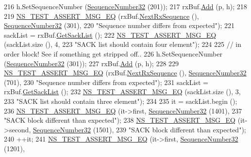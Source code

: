 \begin{DoxyCode}
216   h.SetSequenceNumber (\hyperlink{classns3_1_1SequenceNumber}{SequenceNumber32} (201));
217   rxBuf.\hyperlink{classns3_1_1TcpRxBuffer_a35a036383b8976cb79738c28aa01d5d0}{Add} (p, h);
218 
219   \hyperlink{group__testing_ga2a9d78cffb3db8e867c35fff0b698cf5}{NS\_TEST\_ASSERT\_MSG\_EQ} (rxBuf.\hyperlink{classns3_1_1TcpRxBuffer_ae994bf90329d10f17b59d32907b04ca9}{NextRxSequence} (), 
      \hyperlink{group__network_gacb2070e4e98d2d5135c9bede58f07a03}{SequenceNumber32} (301),
220                          \textcolor{stringliteral}{"Sequence number differs from expected"});
221   sackList = rxBuf.\hyperlink{classns3_1_1TcpRxBuffer_afc5d672da4595330754de1bb3933a9c7}{GetSackList} ();
222   \hyperlink{group__testing_ga2a9d78cffb3db8e867c35fff0b698cf5}{NS\_TEST\_ASSERT\_MSG\_EQ} (sackList.size (), 4,
223                          \textcolor{stringliteral}{"SACK list should contain four element"});
224 
225   \textcolor{comment}{// in order block! See if something get stripped off..}
226   h.SetSequenceNumber (\hyperlink{classns3_1_1SequenceNumber}{SequenceNumber32} (301));
227   rxBuf.\hyperlink{classns3_1_1TcpRxBuffer_a35a036383b8976cb79738c28aa01d5d0}{Add} (p, h);
228 
229   \hyperlink{group__testing_ga2a9d78cffb3db8e867c35fff0b698cf5}{NS\_TEST\_ASSERT\_MSG\_EQ} (rxBuf.\hyperlink{classns3_1_1TcpRxBuffer_ae994bf90329d10f17b59d32907b04ca9}{NextRxSequence} (), 
      \hyperlink{group__network_gacb2070e4e98d2d5135c9bede58f07a03}{SequenceNumber32} (701),
230                          \textcolor{stringliteral}{"Sequence number differs from expected"});
231   sackList = rxBuf.\hyperlink{classns3_1_1TcpRxBuffer_afc5d672da4595330754de1bb3933a9c7}{GetSackList} ();
232   \hyperlink{group__testing_ga2a9d78cffb3db8e867c35fff0b698cf5}{NS\_TEST\_ASSERT\_MSG\_EQ} (sackList.size (), 3,
233                          \textcolor{stringliteral}{"SACK list should contain three element"});
234 
235   it = sackList.begin ();
236   \hyperlink{group__testing_ga2a9d78cffb3db8e867c35fff0b698cf5}{NS\_TEST\_ASSERT\_MSG\_EQ} (it->first, \hyperlink{classns3_1_1SequenceNumber}{SequenceNumber32} (1401),
237                          \textcolor{stringliteral}{"SACK block different than expected"});
238   \hyperlink{group__testing_ga2a9d78cffb3db8e867c35fff0b698cf5}{NS\_TEST\_ASSERT\_MSG\_EQ} (it->second, \hyperlink{classns3_1_1SequenceNumber}{SequenceNumber32} (1501),
239                          \textcolor{stringliteral}{"SACK block different than expected"});
240   ++it;
241   \hyperlink{group__testing_ga2a9d78cffb3db8e867c35fff0b698cf5}{NS\_TEST\_ASSERT\_MSG\_EQ} (it->first, \hyperlink{classns3_1_1SequenceNumber}{SequenceNumber32} (1201),

\end{DoxyCode}
